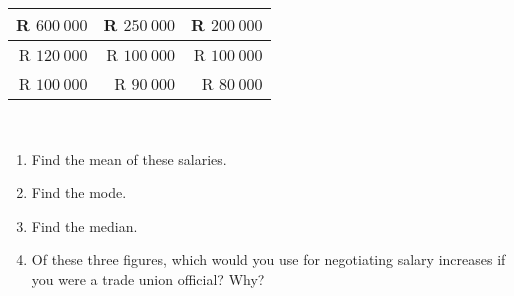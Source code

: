 \begin{eocexercises}{}
\begin{enumerate}[itemsep=6pt, label=\textbf{\arabic*}.]
\begin{center}
\begin{tabular}{|r|r|r|}
        R $600~ 000$ & R $250~ 000$ & R $200~ 000$ \\\hline
        R $120 ~000 $& R $100~ 000$ & R $100 ~000$ \\\hline
        R $100 ~000$ & R  $90~ 000$ & R  $80 ~000$ \\\hline
      \end{tabular}
    \end{center}
\vspace {8pt}\\
    \begin{enumerate}[noitemsep, label=\textbf{(\alph*)} ]
    \item Find the mean of these salaries.
    \item Find the mode.
    \item Find the median.
    \item Of these three figures, which would you use for
      negotiating salary increases if you were a trade union
      official? Why?
    \end{enumerate}
  \end{enumerate}

\end{eocexercises}



